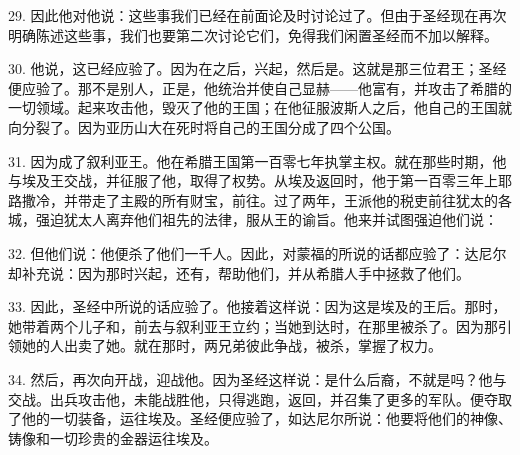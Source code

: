 29. 因此他对他说：这些事我们已经在前面论及时讨论过了。但由于圣经现在再次明确陈述这些事，我们也要第二次讨论它们，免得我们闲置圣经而不加以解释。\par

30. 他说，这已经应验了。因为在之后，兴起，然后是。这就是那三位君王；圣经便应验了。那不是别人，正是，他统治并使自己显赫——他富有，并攻击了希腊的一切领域。起来攻击他，毁灭了他的王国；在他征服波斯人之后，他自己的王国就向分裂了。因为亚历山大在死时将自己的王国分成了四个公国。\par

31. 因为成了叙利亚王。他在希腊王国第一百零七年执掌主权。就在那些时期，他与埃及王交战，并征服了他，取得了权势。从埃及返回时，他于第一百零三年上耶路撒冷，并带走了主殿的所有财宝，前往。过了两年，王派他的税吏前往犹太的各城，强迫犹太人离弃他们祖先的法律，服从王的谕旨。他来并试图强迫他们说：\par

32. 但他们说：他便杀了他们一千人。因此，对蒙福的所说的话都应验了：达尼尔却补充说：因为那时兴起，还有，帮助他们，并从希腊人手中拯救了他们。\par

33. 因此，圣经中所说的话应验了。他接着这样说：因为这是埃及的王后。那时，她带着两个儿子和，前去与叙利亚王立约；当她到达时，在那里被杀了。因为那引领她的人出卖了她。就在那时，两兄弟彼此争战，被杀，掌握了权力。\par

34. 然后，再次向开战，迎战他。因为圣经这样说：是什么后裔，不就是吗？他与交战。出兵攻击他，未能战胜他，只得逃跑，返回，并召集了更多的军队。便夺取了他的一切装备，运往埃及。圣经便应验了，如达尼尔所说：他要将他们的神像、铸像和一切珍贵的金器运往埃及。\par

